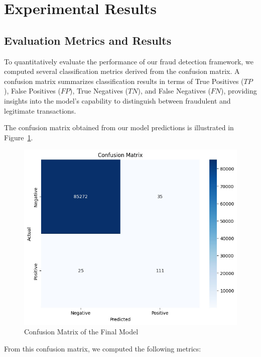 \section{Experimental Results}
\subsection{Evaluation Metrics and Results}
To quantitatively evaluate the performance of our fraud detection framework, we computed several classification metrics derived from the confusion matrix. A confusion matrix summarizes classification results in terms of True Positives ($TP$), False Positives ($FP$), True Negatives ($TN$), and False Negatives ($FN$), providing insights into the model's capability to distinguish between fraudulent and legitimate transactions.

The confusion matrix obtained from our model predictions is illustrated in Figure~\ref{fig:confusion-matrix}.

\begin{figure}[h]
    \centering
    \includegraphics[width=0.8\linewidth]{images/confusion_matrix.jpg}
    \caption{Confusion Matrix of the Final Model}
    \label{fig:confusion-matrix}
\end{figure}

From this confusion matrix, we computed the following metrics:

